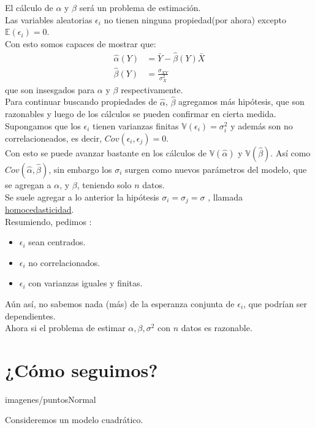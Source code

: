 \documentclass[10pt]{article}
\theoremstyle{plain}
\theoremstyle{definition}
\begin{document}
El cálculo de $\alpha$ y $\beta$ será un problema de estimación.\\
Las variables aleatorias $\epsilon_{i}$ no tienen ninguna propiedad(por ahora) excepto $\mathbb{E}(\epsilon_{i}) = 0$.\\
Con esto somos capaces de mostrar que:
\begin{align*}
\hat{\alpha}(Y) &= \bar{Y} - \hat{\beta}(Y)\bar{X}\\
\hat{\beta}(Y) &= \frac{\sigma_{XY}}{\sigma_{X}^2}
\end{align*}
que son insesgados para $\alpha$ y $\beta$ respectivamente.\\

Para continuar buscando propiedades de $\hat{\alpha}$, $\hat{\beta}$ agregamos más hipótesis, que son razonables y luego de los cálculos se pueden confirmar en cierta medida.\\

Supongamos que los $\epsilon_{i}$ tienen varianzas finitas $\mathbb{V}(\epsilon_{i}) = \sigma_{i}^2$ y además son no correlacioneados, es decir, $Cov(\epsilon_{i},\epsilon_{j}) = 0$.\\

Con esto se puede avanzar bastante en los cálculos de $\mathbb{V}(\hat{\alpha})$ y $\mathbb{V}(\hat{\beta})$. Así como $Cov(\hat{\alpha},\hat{\beta})$, sin embargo los $\sigma_{i}$ surgen como nuevos parámetros del modelo, que se agregan a $\alpha$, y $\beta$, teniendo solo $n$ datos.\\

Se suele agregar a lo anterior la hipótesis $\sigma_{i} = \sigma_{j} = \sigma$ , llamada \underline{homocedasticidad}.\\

Resumiendo, pedimos :
\begin{itemize}
\item $\epsilon_{i}$ sean centrados.
\item $\epsilon_{i}$ no correlacionados.
\item $\epsilon_{i}$ con varianzas iguales y finitas.
\end{itemize}
Aún así, no sabemos nada (más) de la esperanza conjunta de $\epsilon_{i}$, que podrían ser dependientes.\\

Ahora si el problema de estimar $\alpha,\beta,\sigma^2$ con $n$ datos es razonable.\\

\section{¿Cómo seguimos?}
\begin{center}
imagenes/puntosNormal
\end{center}
Consideremos un modelo cuadrático.\\
\end{document}
